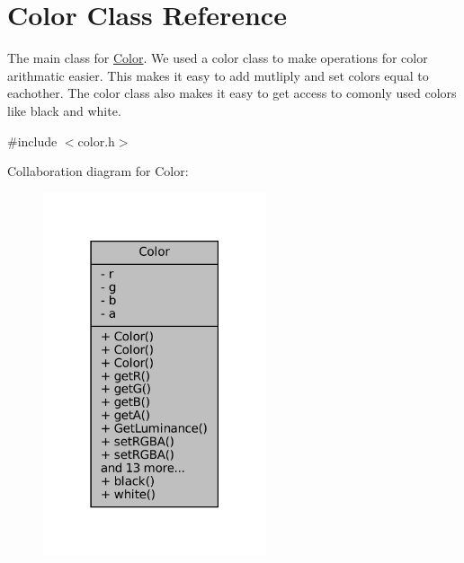 \hypertarget{classColor}{}\section{Color Class Reference}
\label{classColor}


The main class for \hyperlink{classColor}{Color}. We used a color class to make operations for color arithmatic easier. This makes it easy to add mutliply and set colors equal to eachother. The color class also makes it easy to get access to comonly used colors like black and white.  




{\ttfamily \#include $<$color.\+h$>$}



Collaboration diagram for Color\+:\nopagebreak
\begin{figure}[H]
\begin{center}
\leavevmode
\includegraphics[width=186pt]{classColor__coll__graph}
\end{center}
\end{figure}
